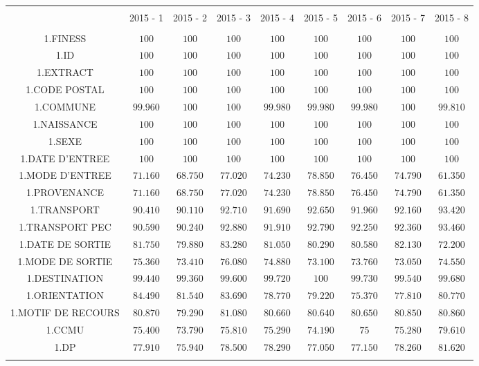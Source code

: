 \documentclass[]{article}
\begin{document}
\begin{table}[!htbp] \centering 
  \caption{} 
  \label{} 
\begin{tabular}{@{\extracolsep{5pt}} ccccccccc} 
\\[-1.8ex]\hline 
\hline \\[-1.8ex] 
 & 2015 - 1 & 2015 - 2 & 2015 - 3 & 2015 - 4 & 2015 - 5 & 2015 - 6 & 2015 - 7 & 2015 - 8 \\ 
\hline \\[-1.8ex] 
1.FINESS & $100$ & $100$ & $100$ & $100$ & $100$ & $100$ & $100$ & $100$ \\ 
1.ID & $100$ & $100$ & $100$ & $100$ & $100$ & $100$ & $100$ & $100$ \\ 
1.EXTRACT & $100$ & $100$ & $100$ & $100$ & $100$ & $100$ & $100$ & $100$ \\ 
1.CODE POSTAL & $100$ & $100$ & $100$ & $100$ & $100$ & $100$ & $100$ & $100$ \\ 
1.COMMUNE & $99.960$ & $100$ & $100$ & $99.980$ & $99.980$ & $99.980$ & $100$ & $99.810$ \\ 
1.NAISSANCE & $100$ & $100$ & $100$ & $100$ & $100$ & $100$ & $100$ & $100$ \\ 
1.SEXE & $100$ & $100$ & $100$ & $100$ & $100$ & $100$ & $100$ & $100$ \\ 
1.DATE D'ENTREE & $100$ & $100$ & $100$ & $100$ & $100$ & $100$ & $100$ & $100$ \\ 
1.MODE D'ENTREE & $71.160$ & $68.750$ & $77.020$ & $74.230$ & $78.850$ & $76.450$ & $74.790$ & $61.350$ \\ 
1.PROVENANCE & $71.160$ & $68.750$ & $77.020$ & $74.230$ & $78.850$ & $76.450$ & $74.790$ & $61.350$ \\ 
1.TRANSPORT & $90.410$ & $90.110$ & $92.710$ & $91.690$ & $92.650$ & $91.960$ & $92.160$ & $93.420$ \\ 
1.TRANSPORT PEC & $90.590$ & $90.240$ & $92.880$ & $91.910$ & $92.790$ & $92.250$ & $92.360$ & $93.460$ \\ 
1.DATE DE SORTIE & $81.750$ & $79.880$ & $83.280$ & $81.050$ & $80.290$ & $80.580$ & $82.130$ & $72.200$ \\ 
1.MODE DE SORTIE & $75.360$ & $73.410$ & $76.080$ & $74.880$ & $73.100$ & $73.760$ & $73.050$ & $74.550$ \\ 
1.DESTINATION & $99.440$ & $99.360$ & $99.600$ & $99.720$ & $100$ & $99.730$ & $99.540$ & $99.680$ \\ 
1.ORIENTATION & $84.490$ & $81.540$ & $83.690$ & $78.770$ & $79.220$ & $75.370$ & $77.810$ & $80.770$ \\ 
1.MOTIF DE RECOURS & $80.870$ & $79.290$ & $81.080$ & $80.660$ & $80.640$ & $80.650$ & $80.850$ & $80.860$ \\ 
1.CCMU & $75.400$ & $73.790$ & $75.810$ & $75.290$ & $74.190$ & $75$ & $75.280$ & $79.610$ \\ 
1.DP & $77.910$ & $75.940$ & $78.500$ & $78.290$ & $77.050$ & $77.150$ & $78.260$ & $81.620$ \\ 
\hline \\[-1.8ex] 
\end{tabular} 
\end{table}
\end{document}
